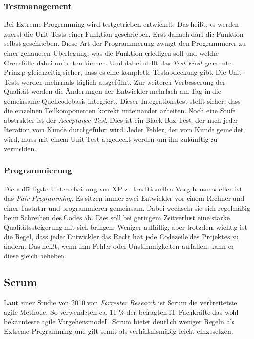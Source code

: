 \subsubsection{Testmanagement}
Bei Extreme Programming wird testgetrieben entwickelt. Das heißt, es werden zuerst die Unit-Tests einer Funktion geschrieben. Erst danach darf die Funktion selbst geschrieben. Diese Art der Programmierung zwingt den Programmierer zu einer genaueren Überlegung, was die Funktion erledigen soll und welche Grenzfälle dabei auftreten können. Und dabei stellt das \emph{Test First} genannte Prinzip gleichzeitig sicher, dass es eine komplette Testabdeckung gibt. Die Unit-Tests werden mehrmals täglich ausgeführt. Zur weiteren Verbesserung der Qualität werden die Änderungen der Entwickler mehrfach am Tag in die gemeinsame Quellcodebasis integriert. Dieser Integrationstest stellt sicher, dass die einzelnen Teilkomponenten korrekt miteinander arbeiten. Noch eine Stufe abstrakter ist der \emph{Acceptance Test}. Dies ist ein Black-Box-Test, der nach jeder Iteration vom Kunde durchgeführt wird. Jeder Fehler, der vom Kunde gemeldet wird, muss mit einem Unit-Test abgedeckt werden um ihn zukünftig zu vermeiden.

\subsubsection{Programmierung}
Die auffälligste Unterscheidung von XP zu traditionellen Vorgehensmodellen ist das \emph{Pair Programming}. Es sitzen immer zwei Entwickler vor einem Rechner und einer Tastatur und programmieren gemeinsam. Dabei wechseln sie sich regelmäßig beim Schreiben des Codes ab. Dies soll bei geringem Zeitverlust eine starke Qualitätssteigerung mit sich bringen. Weniger auffällig, aber trotzdem wichtig ist die Regel, dass jeder Entwickler das Recht hat jede Codezeile des Projektes zu ändern. Das heißt, wenn ihm Fehler oder Unstimmigkeiten auffallen, kann er diese gleich beheben.

\subsection{Scrum}
\label{ch:scrum}
Laut einer Studie von 2010 von \emph{Forrester Research} ist Scrum die verbreitetste agile Methode. So verwendeten ca. 11 \% der befragten IT-Fach\-kräfte das wohl bekannteste agile Vorgehensmodell. \cite{bib:ane} Scrum bietet deutlich weniger Regeln als Extreme Programming und gilt somit als verhältnismäßig leicht einzusetzen. 

